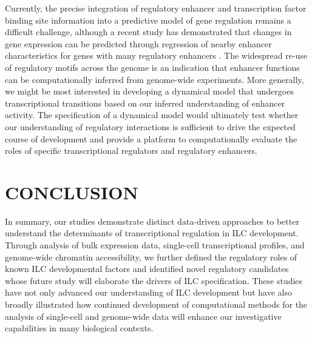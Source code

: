 Currently, the precise integration of regulatory enhancer and transcription factor binding site information into a predictive model of gene regulation remains a difficult challenge, although a recent study has demonstrated that changes in gene expression can be predicted through regression of nearby enhancer characteristics for genes with many regulatory enhancers \cite{Gonzalez2015}. The widespread re-use of regulatory motifs across the genome is an indication that enhancer functions can be computationally inferred from genome-wide experiments. More generally, we might be most interested in developing a dynamical model that undergoes transcriptional transitions based on our inferred understanding of enhancer activity. The specification of a dynamical model would ultimately test whether our understanding of regulatory interactions is sufficient to drive the expected course of development and provide a platform to computationally evaluate the roles of specific transcriptional regulators and regulatory enhancers.

\section{CONCLUSION}

In summary, our studies demonstrate distinct data-driven approaches to better understand the determinants of transcriptional regulation in ILC development. Through analysis of bulk expression data, single-cell transcriptional profiles, and genome-wide chromatin accessibility, we further defined the regulatory roles of known ILC developmental factors and identified novel regulatory candidates whose future study will elaborate the drivers of ILC specification. These studies have not only advanced our understanding of ILC development but have also broadly illustrated how continued development of computational methods for the analysis of single-cell and genome-wide data will enhance our investigative capabilities in many biological contexts. 





